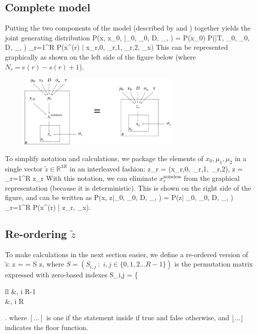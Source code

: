 \subsection{Complete model}
Putting the two components of the model (described by  and ) together yields the joint generating distribution
\bel
	P(x, x_0, \mu\;|\;\mu_0, \nu_0, D, \sigma_\mu, \tau) = P(x_0)\; P\Big(\mu\;\Big|\;T, \mu_0, \nu_0, D, \sigma_\mu, \tau\Big) \prod_{r=1}^R P\Big(x^{(r)} \;\Big|\; x_{r,0}, \mu_{r,1}, \mu_{r,2}, \sigma_x\Big)
\eel
This can be represented graphically as shown on the left side of the figure below (where $N_r = e(r) - s(r) + 1$).
\begin{figure}[h]
	\centering
	\includegraphics[width=0.7\textwidth]{./figs/graphical_model.pdf}
\end{figure}

To simplify notation and calculations, we package the elements of $x_0, \mu_1, \mu_2$ in a single vector $\tilde z\in \mathds{R}^{3R}$ in an interleaved fashion:
\be
	z_r = (x_{r,0}, \,\mu_{r,1}, \,\mu_{r,2})\quad, \qquad \tilde z = \bigoplus_{r=1}^R z_r
\ee
With this notation, we can eliminate $x_r^\text{noiseless}$ from the graphical representation (because it is deterministic). This is shown on the right side of the figure, and can be written as
\be
	P(x, \tilde z\;|\;\mu_0, \nu_0, D, \sigma_\mu, \tau) = P\Big(\tilde z\;\Big|\; \mu_0, \nu_0, D, \sigma_\mu, \tau\Big) \prod_{r=1}^R P\Big(x^{(r)} \;\Big|\; z_r, \sigma_x\Big)\quad .
\ee

\subsection{Re-ordering $\tilde z$}
To make calculations in the next section easier, we define a re-ordered version of $\tilde z$:
\bel
\label{eq:def_S}
	z =  \left[\bigoplus_{r=1}^R x_{r,0}\right]\oplus \left[\bigoplus_{r=1}^R (\mu_{r,1}, \mu_{r,2})\right] = S \tilde z\quad ,
\eel
where $S = (S_{i,j}\;:\; i,j\in\{0,1,2\ldots R-1\})$ is the permutation matrix expressed with zero-based indexes
\ba
	S_{i,j} = \left\{
	\begin{array}{ll}
		\big[j = 3i\big] &, \quad {}\quad i \leq R-1 \\
		\big[j = i - R + 1 + \lfloor (i-R)/2\rfloor\big] &, \quad {}\quad i \geq R
	\end{array}
	\right.
\ea
where $[\ldots]$ is one if the statement inside if true and false otherwise, and $\lfloor \ldots \rfloor$ indicates the floor function.

